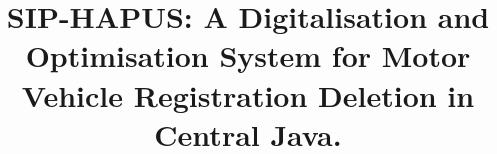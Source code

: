 \documentclass[conference,a4paper]{IEEEtran}
\begin{document}
\title{SIP-HAPUS: A Digitalisation and Optimisation System for Motor Vehicle Registration Deletion in Central Java.}

\end{document}
